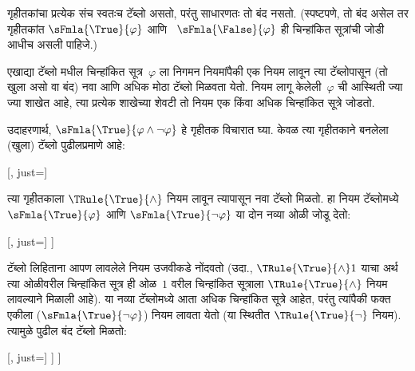 \begin{ex}
  गृहीतकांचा प्रत्येक संच स्वतःच टॅब्लो असतो, परंतु साधारणतः तो बंद
  नसतो. (स्पष्टपणे, तो बंद असेल तर गृहीतकांत $\sFmla{\True}{\varphi}$ आणि
  ~$\sFmla{\False}{\varphi}$ ही चिन्हांकित सूत्रांची जोडी आधीच असली पाहिजे.)

  एखाद्या टॅब्लो मधील चिन्हांकित सूत्र~$\varphi$ ला निगमन नियमांपैकी
  एक नियम लावून त्या टॅब्लोपासून (तो खुला असो वा बंद) नवा आणि अधिक मोठा
  टॅब्लो मिळवता येतो. नियम लागू केलेली~$\varphi$ ची आस्थिती ज्या ज्या शाखेत
  आहे, त्या प्रत्येक शाखेच्या शेवटी तो नियम एक किंवा अधिक
  चिन्हांकित सूत्रे जोडतो.

  उदाहरणार्थ, $\sFmla{\True}{\varphi \land \lnot \varphi}$ हे गृहीतक विचारात घ्या.
  केवळ त्या गृहीतकाने बनलेला (खुला) टॅब्लो पुढीलप्रमाणे आहे:
  \begin{center}
    \begin{tableau}{}
      [\sFmla{\True}{\varphi \land \lnot \varphi}, just=\TAss]
    \end{tableau}{}
  \end{center}
  त्या गृहीतकाला $\TRule{\True}{\land}$ नियम लावून त्यापासून नवा
  टॅब्लो मिळतो. हा नियम टॅब्लोमध्ये $\sFmla{\True}{\varphi}$ आणि
  $\sFmla{\True}{\lnot \varphi}$ या दोन नव्या ओळी जोडू देतो:
  \begin{center}
    \begin{tableau}{}
      [\sFmla{\True}{\varphi \land \lnot \varphi}, just=\TAss
        [\sFmla{\True}{\varphi}, just={\TRule{\True}{\land}[1]},
          [\sFmla{\True}{\lnot \varphi}, just={\TRule{\True}{\land}[1]}
          ]
        ]
      ]
    \end{tableau}{}
  \end{center}
  टॅब्लो लिहिताना आपण लावलेले नियम उजवीकडे नोंदवतो (उदा.,
  $\TRule{\True}{\land} 1$ याचा अर्थ त्या ओळीवरील चिन्हांकित सूत्र ही
  ओळ~$1$ वरील चिन्हांकित सूत्राला $\TRule{\True}{\land}$ नियम लावल्याने
  मिळाली आहे). या नव्या टॅब्लोमध्ये आता अधिक चिन्हांकित सूत्रे
  आहेत, परंतु त्यांपैकी फक्त एकीला ($\sFmla{\True}{\lnot \varphi}$) नियम लावता
  येतो (या स्थितीत $\TRule{\True}{\lnot}$ नियम). त्यामुळे पुढील बंद
  टॅब्लो मिळतो:
  \begin{center}
    \begin{tableau}{}
      [\sFmla{\True}{\varphi \land \lnot \varphi}, just=\TAss
        [\sFmla{\True}{\varphi}, just={\TRule{\True}{\land}[1]}
          [\sFmla{\True}{\lnot \varphi}, just={\TRule{\True}{\land}[1]}
            [\sFmla{\False}{\varphi}, just={\TRule{\True}{\lnot}[3]}, close]
          ]
        ]
      ]
    \end{tableau}{}
  \end{center}
\end{ex}












